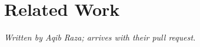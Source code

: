 \section{Related Work}
\label{sec:related}

\emph{Written by Aqib Raza; arrives with their pull request.}
